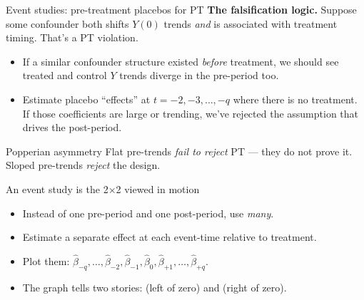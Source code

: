 \documentclass[aspectratio=169,11pt]{beamer}
\begin{document}
\begin{frame}{Event studies: pre-treatment placebos for PT}
\vspace{0.2em}
\footnotesize
\textbf{The falsification logic.} \;Suppose some confounder both shifts $Y(0)$ trends \textit{and} is associated with treatment timing. \;That's a PT violation.

\vspace{0.4em}
\begin{itemize}\setlength\itemsep{3pt}
  \item If a similar confounder structure existed \textit{before} treatment, we should see treated and control $Y$ trends diverge in the pre-period too.
  \item Estimate placebo ``effects'' at $t=-2, -3, \ldots, -q$ where there is no treatment. If those coefficients are large or trending, we've rejected the assumption that drives the post-period.
\end{itemize}
\vspace{0.4em}
\begin{block}{Popperian asymmetry}
\small
Flat pre-trends \textit{fail to reject} PT --- they do not prove it. \\ Sloped pre-trends \textit{reject} the design.
\end{block}
\vspace{0.2em}
\begin{center}
\end{center}
\end{frame}

\begin{frame}{An event study is the 2$\times$2 viewed in motion}
\vspace{0.6em}
\begin{itemize}\setlength\itemsep{4pt}
  \item Instead of one pre-period and one post-period, use \textit{many}.
  \item Estimate a separate effect at each event-time relative to treatment.
  \item Plot them: $\hat{\beta}_{-q}, \ldots, \hat{\beta}_{-2}, \hat{\beta}_{-1}, \hat{\beta}_{0}, \hat{\beta}_{+1}, \ldots, \hat{\beta}_{+q}$.
  \item The graph tells two stories:  (left of zero) and  (right of zero).
\end{itemize}
\vspace{0.4em}
\end{frame}
\end{document}
